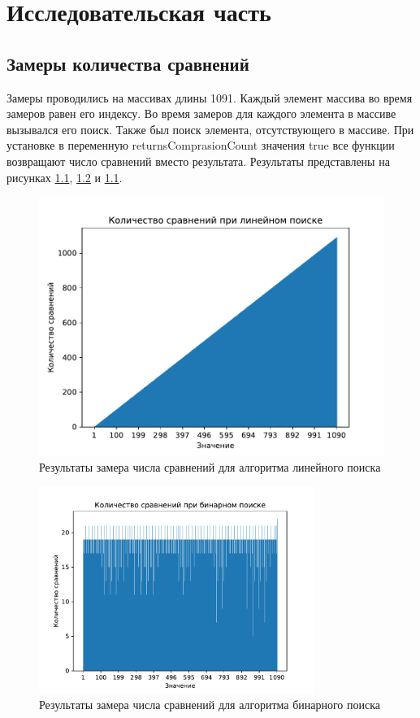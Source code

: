 \chapter{Исследовательская часть}

\section{Замеры количества сравнений}

Замеры проводились на массивах длины 1091. Каждый элемент массива во время замеров равен его индексу. Во время замеров для каждого элемента в массиве вызывался его поиск. Также был поиск элемента, отсутствующего в массиве. При установке в переменную returnsComprasionCount значения true все функции возвращают число сравнений вместо результата. Результаты представлены на рисунках \ref{fig:res1}, \ref{fig:res2} и \ref{fig:res1}.

\begin{figure}[h!]
	\centering
	\includegraphics[width=1\textwidth]{tex_parts/linear_graph.pdf}
	\caption{\label{fig:res1} Результаты замера числа сравнений для алгоритма линейного поиска}
\end{figure}

\clearpage

\begin{figure}[h!]
	\centering
	\includegraphics[width=0.8\textwidth]{tex_parts/binary_graph.pdf}
	\caption{\label{fig:res2} Результаты замера числа сравнений для алгоритма бинарного поиска}
\end{figure}

